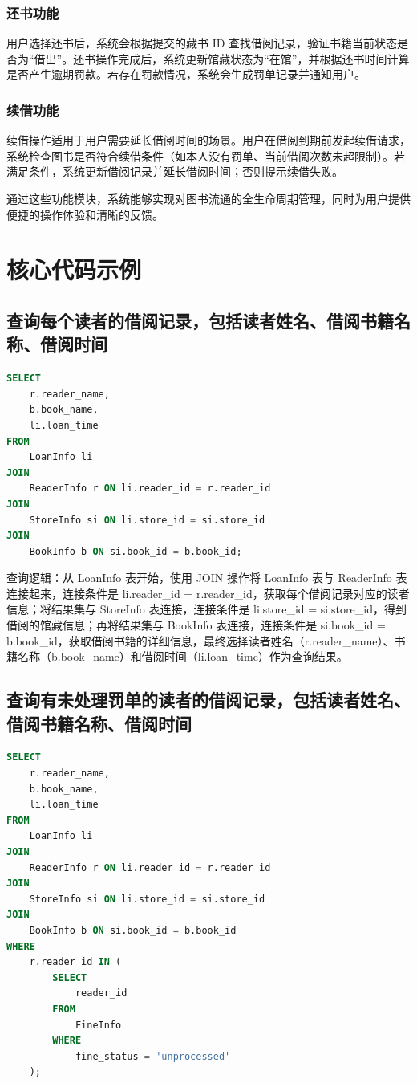 \documentclass[a4paper,14pt]{article}
\begin{document}
\subsubsection{还书功能}
用户选择还书后，系统会根据提交的藏书 ID 查找借阅记录，验证书籍当前状态是否为“借出”。还书操作完成后，系统更新馆藏状态为“在馆”，并根据还书时间计算是否产生逾期罚款。若存在罚款情况，系统会生成罚单记录并通知用户。

\subsubsection{续借功能}
续借操作适用于用户需要延长借阅时间的场景。用户在借阅到期前发起续借请求，系统检查图书是否符合续借条件（如本人没有罚单、当前借阅次数未超限制）。若满足条件，系统更新借阅记录并延长借阅时间；否则提示续借失败。

通过这些功能模块，系统能够实现对图书流通的全生命周期管理，同时为用户提供便捷的操作体验和清晰的反馈。



\section{核心代码示例}

\subsection{查询每个读者的借阅记录，包括读者姓名、借阅书籍名称、借阅时间}
\begin{lstlisting}[language=sql,breaklines=true]
SELECT 
    r.reader_name,
    b.book_name,
    li.loan_time
FROM 
    LoanInfo li
JOIN 
    ReaderInfo r ON li.reader_id = r.reader_id
JOIN 
    StoreInfo si ON li.store_id = si.store_id
JOIN 
    BookInfo b ON si.book_id = b.book_id;
\end{lstlisting}

查询逻辑：从 LoanInfo 表开始，使用 JOIN 操作将 LoanInfo 表与 ReaderInfo 表连接起来，连接条件是 li.reader\_id = r.reader\_id，获取每个借阅记录对应的读者信息；将结果集与 StoreInfo 表连接，连接条件是 li.store\_id = si.store\_id，得到借阅的馆藏信息；再将结果集与 BookInfo 表连接，连接条件是 si.book\_id = b.book\_id，获取借阅书籍的详细信息，最终选择读者姓名（r.reader\_name）、书籍名称（b.book\_name）和借阅时间（li.loan\_time）作为查询结果。


\subsection{查询有未处理罚单的读者的借阅记录，包括读者姓名、借阅书籍名称、借阅时间}
\begin{lstlisting}[language=sql, breaklines=true]
SELECT 
    r.reader_name,
    b.book_name,
    li.loan_time
FROM 
    LoanInfo li
JOIN 
    ReaderInfo r ON li.reader_id = r.reader_id
JOIN 
    StoreInfo si ON li.store_id = si.store_id
JOIN 
    BookInfo b ON si.book_id = b.book_id
WHERE 
    r.reader_id IN (
        SELECT 
            reader_id 
        FROM 
            FineInfo 
        WHERE 
            fine_status = 'unprocessed'
    );
\end{lstlisting}
\end{document}
